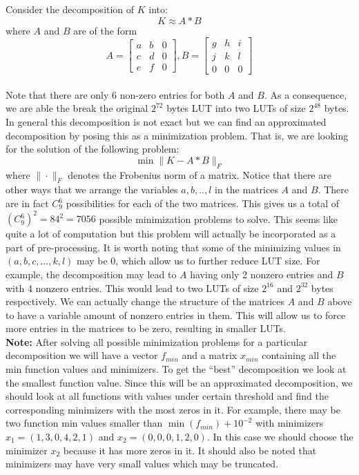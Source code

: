 \documentclass[12pt]{amsart}
\theoremstyle{definition}
\theoremstyle{remark}
\numberwithin{thm}{section}
\begin{document}
Consider the decomposition of $K$ into:
$$K\approx A*B$$
where $A$ and $B$ are of the form
$$\label{general decomposition}
A
=
\begin{bmatrix}
a & b & 0\\
c & d & 0\\
e & f & 0
\end{bmatrix}
,
B=
\begin{bmatrix}
g & h & i\\
j & k & l\\
0 & 0 & 0
\end{bmatrix}$$
\\
Note that there are only 6 non-zero entries for both $A$ and $B$. As a consequence, we are able the break the original $2^{72}$ bytes LUT into two LUTs of size $2^{48}$ bytes. In general this decomposition is not exact but we can find an approximated decomposition by posing this as a minimization problem. That is, we are looking for the solution of the following problem: 
$$\min \|K-A*B\|_F$$ where $\|\cdot \|_F$ denotes the Frobenius norm of a matrix.
Notice that there are other ways that we arrange the variables $a,b,..,l$ in the matrices $A$ and $B$. There are in fact $C_9^6$ possibilities for each of the two matrices. This gives us a total of  $(C_9^6)^2 =84^2= 7056$ possible minimization problems to solve. This seems like quite a lot of computation but this problem will actually be incorporated as a part of pre-processing. It is worth noting that some of the minimizing values in $(a,b,c,...,k,l)$ may be 0, which allow us to further reduce LUT size. For example, the decomposition may lead to $A$ having only 2 nonzero entries and $B$ with 4 nonzero entries. This would lead to two LUTs of size $2^{16}$ and $2^{32}$ bytes respectively. We can actually change the structure of the matrices $A$ and $B$ above to have a variable amount of nonzero entries in them. This will allow us to force more entries in the matrices to be zero, resulting in smaller LUTs. 
\\
\textbf{Note:} After solving all possible minimization problems for a particular decomposition we will have a vector \textit{$f_{min}$} and a matrix \textit{$x_{min}$} containing all the min function values and minimizers. To get the ``best'' decomposition we look at the smallest function value. Since this will be an approximated decomposition, we should look at all functions with values under certain threshold and find the corresponding minimizers with the most zeros in it. For example, there may be two function min values smaller than $\min(f_{min}) + 10^{-2}$ with minimizers $x_1=(1, 3, 0, 4, 2, 1)$ and $x_2=(0, 0, 0, 1, 2, 0)$. In this case we should choose the minimizer $x_2$ because it has more zeros in it. It should also be noted that minimizers may have very small values which may be truncated. 
\end{document}

